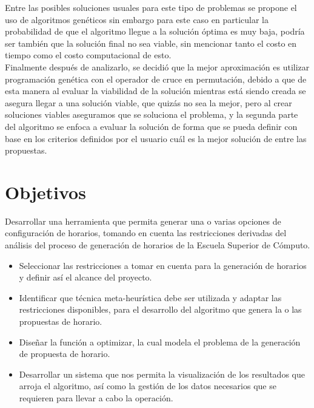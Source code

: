 	Entre las posibles soluciones usuales para este tipo de problemas se propone el uso de algoritmos genéticos sin embargo para este caso en particular la probabilidad de que el algoritmo llegue a la solución óptima es muy baja, podría ser también que la solución final no sea viable, sin mencionar tanto el costo en tiempo como el costo computacional de esto.\\
	
	Finalmente después de analizarlo, se decidió que la mejor aproximación es utilizar programación genética con el operador de cruce en permutación, debido a que de esta manera al evaluar la viabilidad de la solución mientras está siendo creada se asegura llegar a una solución viable, que quizás no sea la mejor, pero al crear soluciones viables aseguramos que se soluciona el problema, y la segunda parte del algoritmo se enfoca a evaluar la solución de forma que se pueda definir con base en los criterios definidos por el usuario cuál es la mejor solución de entre las propuestas.\\

\section{Objetivos}
	Desarrollar una herramienta que permita generar una o varias opciones de configuración de horarios, tomando en cuenta las restricciones derivadas del análisis del proceso de generación de horarios de la Escuela Superior de Cómputo.
	
	\begin{itemize}
		\item Seleccionar las restricciones a tomar en cuenta para la generación de horarios y definir así el alcance del proyecto.
		
		\item Identificar que técnica meta-heurística debe ser utilizada y adaptar las restricciones disponibles, para el  desarrollo del algoritmo que genera la o las propuestas de horario. 
		
		\item Diseñar la función a optimizar, la cual modela el problema de la generación de propuesta de horario.
	
		\item Desarrollar un sistema que nos permita la visualización de los resultados que arroja el algoritmo, así como la gestión de los datos necesarios que se requieren para llevar a cabo la operación.
		
	\end{itemize}
	

